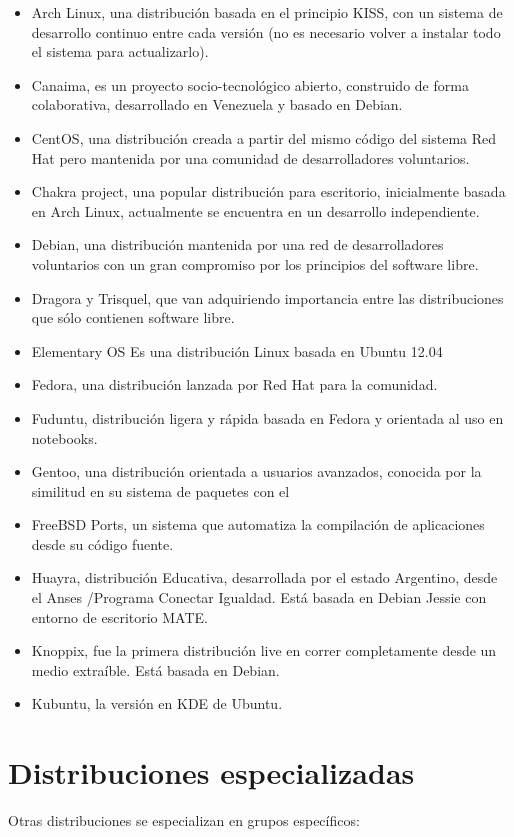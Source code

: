 \begin{itemize}
\item Arch Linux, una distribución basada en el principio KISS, con un sistema de desarrollo continuo entre cada versión (no es necesario volver a instalar todo el sistema para actualizarlo).
\item Canaima, es un proyecto socio-tecnológico abierto, construido de forma colaborativa, desarrollado en Venezuela y basado en Debian.
\item CentOS, una distribución creada a partir del mismo código del sistema Red Hat pero mantenida por una comunidad de desarrolladores voluntarios.
\item Chakra project, una popular distribución para escritorio, inicialmente basada en Arch Linux, actualmente se encuentra en un desarrollo independiente.
\item Debian, una distribución mantenida por una red de desarrolladores voluntarios con un gran compromiso por los principios del software libre.
\item Dragora y Trisquel, que van adquiriendo importancia entre las distribuciones que sólo contienen software libre.
\item Elementary OS Es una distribución Linux basada en Ubuntu 12.04
\item Fedora, una distribución lanzada por Red Hat para la comunidad.
\item Fuduntu, distribución ligera y rápida basada en Fedora y orientada al uso en notebooks.
\item Gentoo, una distribución orientada a usuarios avanzados, conocida por la similitud en su sistema de paquetes con el \item FreeBSD Ports, un sistema que automatiza la compilación de aplicaciones desde su código fuente.
\item Huayra, distribución Educativa, desarrollada por el estado Argentino, desde el Anses /Programa Conectar Igualdad. Está basada en Debian Jessie con entorno de escritorio MATE.
\item Knoppix, fue la primera distribución live en correr completamente desde un medio extraíble. Está basada en Debian.
\item Kubuntu, la versión en KDE de Ubuntu.
\end{itemize}

\section{Distribuciones especializadas}
Otras distribuciones se especializan en grupos específicos:

